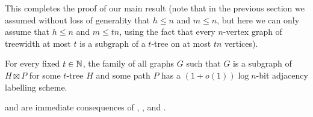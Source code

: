 \documentclass[kpfonts]{patmorin}
\let\le\leqslant
\begin{document}
This completes the proof of our main result (note that in the previous section we assumed without loss of generality that $h\le n$ and $m\le n$, but here we can only assume that $h\le n$ and $m\le tn$, using the fact that every $n$-vertex graph of treewidth at most $t$ is a subgraph of a $t$-tree on at most $tn$ vertices).

\begin{thm}
  For every fixed $t\in\mathbb{N}$, the family of all graphs $G$ such that $G$ is a subgraph of $H\boxtimes P$ for some $t$-tree $H$ and some path $P$ has a $(1+o(1))\log n$-bit adjacency labelling scheme.
\end{thm}

 and  are immediate consequences of , , and .
\end{document}
